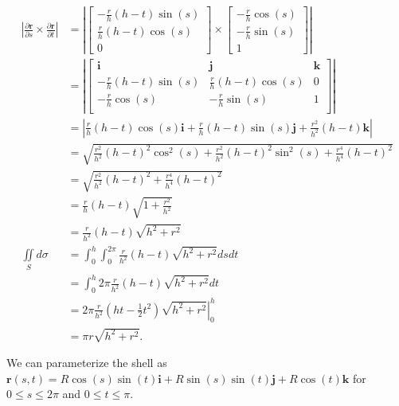 \begin{align*}
 |\frac{\partial \mathbf{r}}{\partial s} \times \frac{\partial \mathbf{r}}{\partial t}|
 &= |\begin{bmatrix}
       -\frac{r}{h}(h - t)\sin(s) \\
       \frac{r}{h}(h - t)\cos(s) \\
       0
      \end{bmatrix} \times \begin{bmatrix}
                            -\frac{r}{h}\cos(s) \\
                            -\frac{r}{h}\sin(s) \\
                            1
                           \end{bmatrix}| \\
 &= |\begin{bmatrix}
      \mathbf{i} & \mathbf{j} & \mathbf{k} \\
      -\frac{r}{h}(h - t)\sin(s) & \frac{r}{h}(h - t)\cos(s) & 0 \\
      -\frac{r}{h}\cos(s) & -\frac{r}{h}\sin(s) & 1 \\
     \end{bmatrix}| \\
 &= | \frac{r}{h}(h - t)\cos(s)\mathbf{i} + \frac{r}{h}(h - t)\sin(s)\mathbf{j} + \frac{r^2}{h^2}(h-t)\mathbf{k} | \\
 &= \sqrt{\frac{r^2}{h^2}(h - t)^2\cos^2(s) + \frac{r^2}{h^2}(h - t)^2\sin^2(s) + \frac{r^4}{h^4}(h-t)^2} \\
 &= \sqrt{\frac{r^2}{h^2}(h - t)^2 + \frac{r^4}{h^4}(h-t)^2} \\
 &= \frac{r}{h}(h-t)\sqrt{1 + \frac{r^2}{h^2}} \\
 &= \frac{r}{h^2}(h-t)\sqrt{h^2 + r^2} \\
 \iint\limits_S \! d\sigma \,
 &= \int_{0}^{h} \int_{0}^{2\pi} \! \frac{r}{h^2}(h-t)\sqrt{h^2 + r^2} ds dt \, \\
 &= \int_{0}^{h} \! 2\pi \frac{r}{h^2}(h-t)\sqrt{h^2 + r^2} dt \, \\
 &= \left. 2\pi \frac{r}{h^2}(ht-\frac{1}{2}t^2)\sqrt{h^2 + r^2} \right|_0^h \\
 &= \pi r \sqrt{h^2 + r^2}.
\end{align*}

\item

We can parameterize the shell as $\mathbf{r}(s,t) = R\cos(s)\sin(t)\mathbf{i} +
R\sin(s)\sin(t)\mathbf{j} + R\cos(t)\mathbf{k}$ for $0 \leq s \leq 2\pi$ and $0
\leq t \leq \pi$.

